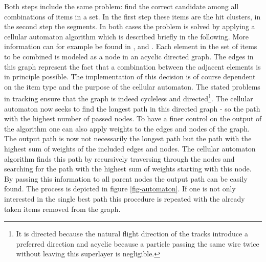 Both steps include the same problem: find the correct candidate among all combinations of items in a set. In the first step these items are the hit clusters, in the second step the segments. In both cases the problem is solved by applying a cellular automaton algorithm which is described briefly in the following. More information can for example be found in \cite{cats}, \cite{kisel} and \cite{oliver}. Each element in the set of items to be combined is modeled as a node in an acyclic directed graph. The edges in this graph represent the fact that a combination between the adjacent elements is in principle possible. The implementation of this decision is of course dependent on the item type and the purpose of the cellular automaton. The stated problems in tracking ensure that the graph is indeed cycleless and directed\footnote{It is directed because the natural flight direction of the tracks introduce a preferred direction and acyclic because a particle passing the same wire twice without leaving this superlayer is negligible.}. The cellular automaton now seeks to find the longest path in this directed graph - so the path with the highest number of passed nodes. To have a finer control on the output of the algorithm one can also apply weights to the edges and nodes of the graph. The output path is now not necessarily the longest path but the path with the highest sum of weights of the included edges and nodes. The cellular automaton algorithm finds this path by recursively traversing through the nodes and searching for the path with the highest sum of weights starting with this node. By passing this information to all parent nodes the output path can be easily found. The process is depicted in figure \ref{fig-automaton}. If one is not only interested in the single best path this procedure is repeated with the already taken items removed from the graph.

